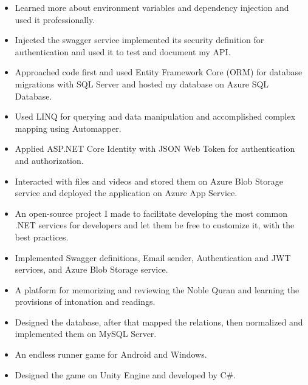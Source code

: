 \begin{itemize}
    \item Learned more about environment variables and dependency injection and used it professionally.
    \item Injected the swagger service implemented its security definition for authentication and used it to test and document my API.
    \item Approached code first and used Entity Framework Core (ORM) for database migrations with SQL Server and hosted my database on Azure SQL Database.
    \item Used LINQ for querying and data manipulation and accomplished complex mapping using Automapper.
    \item Applied ASP.NET Core Identity with JSON Web Token for authentication and authorization.
    \item Interacted with files and videos and stored them on Azure Blob Storage service and deployed the application on Azure App Service.
\end{itemize}

\divider

\begin{itemize}
    \item An open-source project I made to facilitate developing the most common .NET services for developers and let them be free to customize it, with the best practices.
    \item Implemented Swagger definitions, Email sender, Authentication and JWT services, and Azure Blob Storage service.
\end{itemize}

\divider

\begin{itemize}
    \item A platform for memorizing and reviewing the Noble Quran and learning the provisions of intonation and readings.
    \item Designed the database, after that mapped the relations, then normalized and implemented them on MySQL Server.
\end{itemize}

\begin{itemize}
    \item An endless runner game for Android and Windows.
    \item Designed the game on Unity Engine and developed by C\#.
\end{itemize}